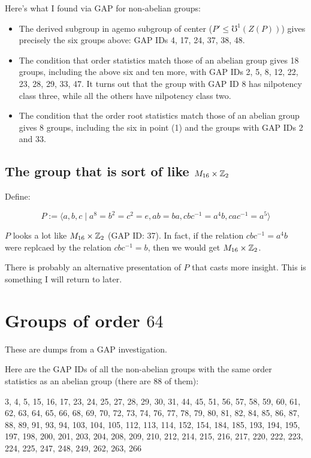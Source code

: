 \documentclass[10pt]{amsart}
\begin{document}
Here's what I found via GAP for non-abelian groups:

\begin{itemize}
\item The derived subgroup in agemo subgroup of center ($P' \le
  \mho^1(Z(P))$) gives precisely the six groups above: GAP IDs 4, 17, 24,
  37, 38, 48.
\item The condition that order statistics match those of an abelian
  group gives 18 groups, including the above six and ten more, with
  GAP IDs 2, 5, 8, 12, 22, 23, 28, 29, 33, 47. It turns out that the
  group with GAP ID 8 has nilpotency class three, while all the others
  have nilpotency class two.
\item The condition that the order root statistics match those of an
  abelian group gives 8 groups, including the six in point (1) and the
  groups with GAP IDs 2 and 33.
\end{itemize}
\subsection{The group that is sort of like $M_{16} \times \mathbb{Z}_2$}

Define:

$$P := \langle a,b,c \mid a^8 = b^2 = c^2 = e, ab = ba, cbc^{-1} = a^4b, cac^{-1} = a^5 \rangle$$

$P$ looks a lot like $M_{16} \times \mathbb{Z}_2$ (GAP ID: 37). In fact, if
the relation $cbc^{-1} = a^4b$ were replcaed by the relation $cbc^{-1}
= b$, then we would get $M_{16} \times \mathbb{Z}_2$.

There is probably an alternative presentation of $P$ that casts more
insight. This is something I will return to later.

\section{Groups of order $64$}

These are dumps from a GAP investigation.

Here are the GAP IDs of all the non-abelian groups with the same order
statistics as an abelian group (there are 88 of them):

3, 4, 5, 15, 16, 17, 23, 24, 25, 27, 28, 29, 30, 31, 44, 45, 51, 56,
57, 58, 59, 60, 61, 62, 63, 64, 65, 66, 68, 69, 70, 72, 73, 74, 76,
77, 78, 79, 80, 81, 82, 84, 85, 86, 87, 88, 89, 91, 93, 94, 103,
104, 105, 112, 113, 114, 152, 154, 184, 185, 193, 194, 195, 197,
198, 200, 201, 203, 204, 208, 209, 210, 212, 214, 215, 216, 217,
220, 222, 223, 224, 225, 247, 248, 249, 262, 263, 266
\end{document}
